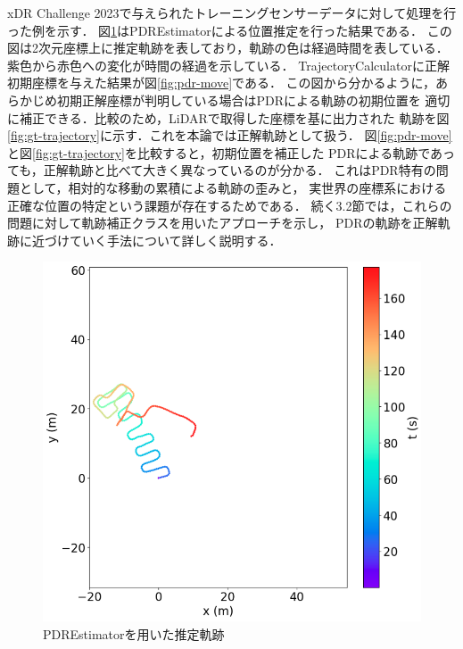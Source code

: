 xDR Challenge 2023で与えられたトレーニングセンサーデータに対して処理を行った例を示す．
図\ref{fig:pdr}はPDREstimatorによる位置推定を行った結果である．
この図は2次元座標上に推定軌跡を表しており，軌跡の色は経過時間を表している．
紫色から赤色への変化が時間の経過を示している．
TrajectoryCalculatorに正解初期座標を与えた結果が図\ref{fig:pdr-move}である．
この図から分かるように，あらかじめ初期正解座標が判明している場合はPDRによる軌跡の初期位置を
適切に補正できる．比較のため，LiDARで取得した座標を基に出力された
軌跡を図\ref{fig:gt-trajectory}に示す．これを本論では正解軌跡として扱う．
図\ref{fig:pdr-move}と図\ref*{fig:gt-trajectory}を比較すると，初期位置を補正した
PDRによる軌跡であっても，正解軌跡と比べて大きく異なっているのが分かる．
これはPDR特有の問題として，相対的な移動の累積による軌跡の歪みと，
実世界の座標系における正確な位置の特定という課題が存在するためである．
続く3.2節では，これらの問題に対して軌跡補正クラスを用いたアプローチを示し，
PDRの軌跡を正解軌跡に近づけていく手法について詳しく説明する．

\begin{figure}[H]
    \centering
    \includegraphics[width=\linewidth]{../image/pdr.jpg}
    \caption{PDREstimatorを用いた推定軌跡}    \label{fig:pdr}
\end{figure}

